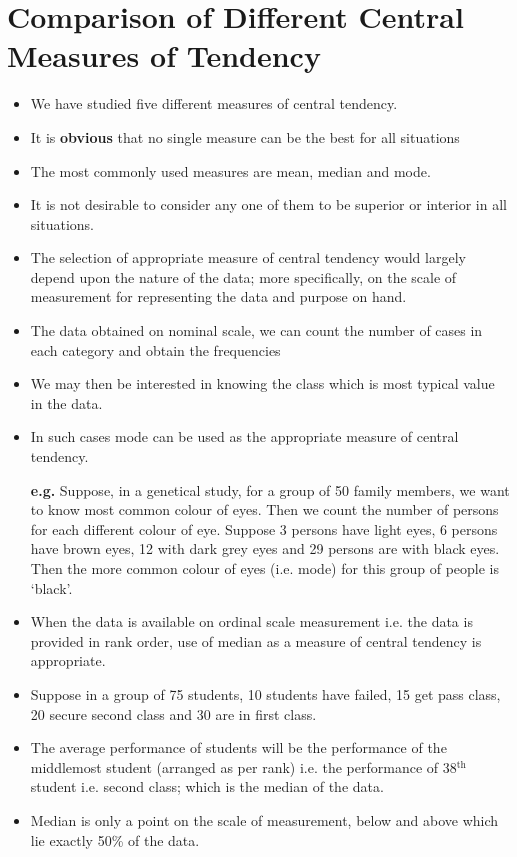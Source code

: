 \documentclass[
10pt, %
a4paper, %
]{report}
\begin{document}
\section*{Comparison of Different Central Measures of Tendency}
\begin{itemize}
\item We have studied five different measures of central tendency.
\item It is \textbf{obvious} that no single measure can be the best for all situations
\item The most commonly used measures are mean, median and mode.
\item It is not desirable to consider any one of them to be superior or interior in all situations.
\item The selection of appropriate measure of central tendency would largely depend upon the nature of the data; more specifically, on the scale of measurement for representing the data and purpose on hand.
\item The data obtained on nominal scale, we can count the number of cases in each category and obtain the frequencies
\item We may then be interested in knowing the class which is most typical value in the data.
\item In such cases mode can be used as the appropriate measure of
central tendency.
\item[\textbf{e.g.}] Suppose, in a genetical study, for a group of 50 family members, we want to know most common colour of eyes. Then we count the number of persons for each different colour of eye. Suppose 3 persons have light eyes, 6 persons have brown eyes, 12 with dark grey eyes and 29 persons are with black eyes. Then the more common colour of eyes (i.e. mode) for this group of people is ‘black’.
\item When the data is available on ordinal scale measurement i.e. the data is provided in rank order, use of median as a measure of central tendency is appropriate.
\item Suppose in a group of 75 students, 10 students have failed, 15 get pass class, 20 secure second class and 30 are in first class.
\item The average performance of students will be the performance of the middlemost student (arranged as per rank) i.e. the performance of 38\(^\text{th}\) student i.e. second class; which is the median of the data.
\item Median is only a point on the scale of measurement, below and above which lie exactly 50\% of the data.

\end{itemize}
\end{document}
